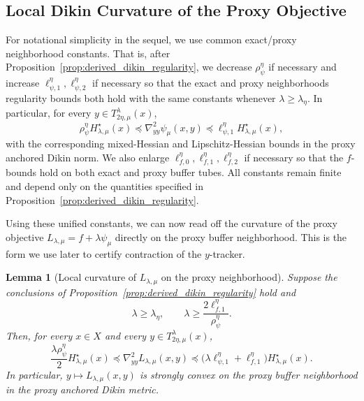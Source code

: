 \documentclass{article}
\newtheorem{lemma}{Lemma}
\begin{document}
\subsection{Local Dikin Curvature of the Proxy Objective}
\label{app:proxy_objective_curvature}

For notational simplicity in the sequel, we use common exact/proxy neighborhood constants. That is, after
Proposition~\ref{prop:derived_dikin_regularity}, we decrease \(\rho_\psi^\eta\) if necessary and
increase \(\ell_{\psi,1}^\eta,\ell_{\psi,2}^\eta\) if necessary so that the exact and proxy neighborhoods
regularity bounds both hold with the same constants whenever \(\lambda\ge\lambda_\eta\). In
particular, for every \(y\in T_{2\eta,\mu}^{\lambda}(x)\),
\begin{equation*}
\rho_\psi^\eta H_{\lambda,\mu}^\star(x)
\preceq
\nabla_{yy}^2\psi_\mu(x,y)
\preceq
\ell_{\psi,1}^\eta H_{\lambda,\mu}^\star(x),
\end{equation*}
with the corresponding mixed-Hessian and Lipschitz-Hessian bounds in the proxy anchored Dikin
norm. We also enlarge \(\ell_{f,0}^\eta,\ell_{f,1}^\eta,\ell_{f,2}^\eta\) if necessary so that the
\(f\)-bounds hold on both exact and proxy buffer tubes. All constants remain finite and depend only
on the quantities specified in Proposition~\ref{prop:derived_dikin_regularity}.

Using these unified constants, we can now read off the curvature of the proxy objective \(L_{\lambda,\mu}=f+\lambda\psi_\mu\) directly on the proxy buffer neighborhood. This is the form we use later to certify contraction of the \(y\)-tracker.

\begin{lemma}[Local curvature of \(L_{\lambda,\mu}\) on the proxy neighborhood]
\label{lem:proxy_objective_curvature}
Suppose the conclusions of Proposition~\ref{prop:derived_dikin_regularity} hold and
\[
\lambda\ge \lambda_\eta,
\qquad
\lambda\ge \frac{2\ell_{f,1}^\eta}{\rho_\psi^\eta}.
\]
Then, for every \(x\in X\) and every
\(y\in T_{2\eta,\mu}^{\lambda}(x)\),
\begin{equation*}
\frac{\lambda\rho_\psi^\eta}{2}H_{\lambda,\mu}^\star(x)
\preceq
\nabla_{yy}^2L_{\lambda,\mu}(x,y)
\preceq
\bigl(\lambda\ell_{\psi,1}^\eta+\ell_{f,1}^\eta\bigr)
H_{\lambda,\mu}^\star(x).
\end{equation*}
In particular, \(y\mapsto L_{\lambda,\mu}(x,y)\) is strongly convex on the proxy buffer neighborhood in the
proxy anchored Dikin metric.
\end{lemma}
\end{document}
